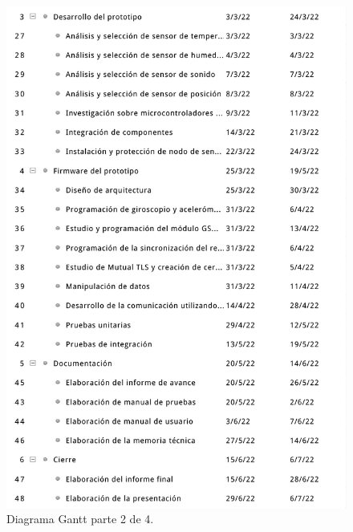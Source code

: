 \documentclass[
11pt, %
codirector, %
]{charter}
\begin{document}
\begin{figure}[htpb]
\centering 
\includegraphics[width=.8\textwidth]{./Figuras/gantt-2.png}
\caption{Diagrama Gantt parte 2 de 4.}
\label{fig:gantt2}
\end{figure}
\end{document}
